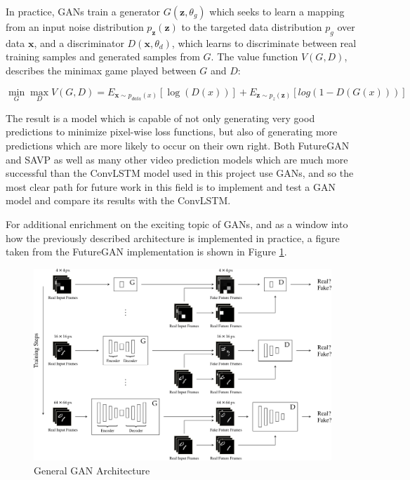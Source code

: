 \documentclass{scrartcl}
\begin{document}
In practice, GANs train a generator $G (\boldsymbol{z}, \theta_g)$ which seeks
to learn a mapping from an input noise distribution $p_{\boldsymbol{z}}
(\boldsymbol{z})$ to the targeted data distribution $p_g$ over data
$\boldsymbol{x}$, and a discriminator $D (\boldsymbol{x}, \theta_d)$, which
learns to discriminate between real training samples and generated samples from
$G$. The value function $V(G, D)$, describes the minimax game played between
$G$ and $D$: 

\begin{equation}
	\min_G \max_D V(G, D) = E_{\boldsymbol{x} \sim p_{data} (x)} [ \log (D(x)) ] 
	+ E_{\boldsymbol{z} \sim p_z (\boldsymbol{z})} [ log(1 - D(G(x))) ] 
	\label{eq:gan_value_function}
\end{equation}

The result is a model which is capable of not only generating very good
predictions to minimize pixel-wise loss functions, but also of generating more
predictions which are more likely to occur on their own right. Both FutureGAN
\cite{futuregan} and SAVP \cite{savp} as well as many other video prediction
models which are much more successful than the ConvLSTM model used in this
project use GANs, and so the most clear path for future work in this field is
to implement and test a GAN model and compare its results with the ConvLSTM.

For additional enrichment on the exciting topic of GANs, and as a window into
how the previously described architecture is implemented in practice, a figure
taken from the FutureGAN implementation is shown in Figure
\ref{fig:futuregan_arch}.

\begin{figure}[H]
	\begin{center}
		\includegraphics[width=1\textwidth]{figures/futuregan_arch.png}
	\end{center}
	\caption{General GAN Architecture}
	\label{fig:futuregan_arch}
\end{figure}
\end{document}
